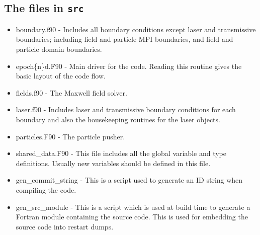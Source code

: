 \documentclass[12pt,a4paper]{article}
\newcommand{\inlinecode}[1]{{\color{warwickred} \bf\texttt{#1}}}
\newcommand{\EPOCH}{{\color{warwickdark}\fontfamily{phv}\selectfont{EPOCH}}}
\begin{document}
\subsection{The files in \inlinecode{src}}
\begin{itemize}
\item boundary.f90 - Includes all boundary conditions except laser and
  transmissive boundaries; including field and particle MPI boundaries, and
  field and particle domain boundaries.
\item epoch\{n\}d.F90 - Main driver for the code. Reading this routine gives
  the basic layout of the code flow.
\item fields.f90 - The Maxwell field solver.
\item laser.f90 - Includes laser and transmissive boundary conditions for each
  boundary and also the housekeeping routines for the laser objects.
\item particles.F90 - The particle pusher.
\item shared\_data.F90 - This file includes all the global variable and type
  definitions. Usually new variables should be defined in this file.
\item gen\_commit\_string - This is a script used to generate an ID string
  when compiling the code.
\item gen\_src\_module - This is a script which is used at build time to
  generate a Fortran module containing the source code. This is used for
  embedding the {\EPOCH} source code into restart dumps.
\end{itemize}
\end{document}
